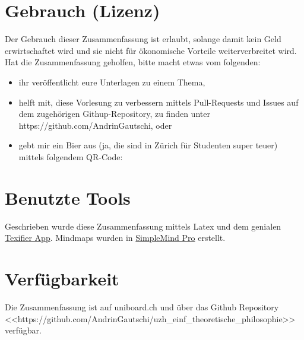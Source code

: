 \documentclass[../main.tex]{subfiles}
\begin{document}
\section{Gebrauch (Lizenz)}
 Der Gebrauch dieser Zusammenfassung ist erlaubt, solange damit kein Geld erwirtschaftet wird und sie nicht für ökonomische Vorteile weiterverbreitet wird. Hat die Zusammenfassung geholfen, bitte macht etwas vom folgenden: 
\begin{itemize}
	\item ihr veröffentlicht eure Unterlagen zu einem Thema,
	\item helft mit, diese Vorlesung zu verbessern mittels Pull-Requests und Issues auf dem zugehörigen Githup-Repository, zu finden unter https://github.com/AndrinGautschi, oder
	\item gebt mir ein Bier aus (ja, die sind in Zürich für Studenten super teuer) mittels folgendem QR-Code:

	\begin{minipage}[t]{\linewidth}
          \raggedright
    \end{minipage}
\end{itemize}

\section{Benutzte Tools}
Geschrieben wurde diese Zusammenfassung mittels Latex und dem genialen \href{https://www.texifier.com/}{Texifier App}. Mindmaps wurden in \href{https://simplemind.eu/}{SimpleMind Pro} erstellt.   


\section{Verfügbarkeit}
Die Zusammenfassung ist auf uniboard.ch und über das Github Repository \\<<https://github.com/AndrinGautschi/uzh\_einf\_theoretische\_philosophie>> verfügbar. 
\end{document}
